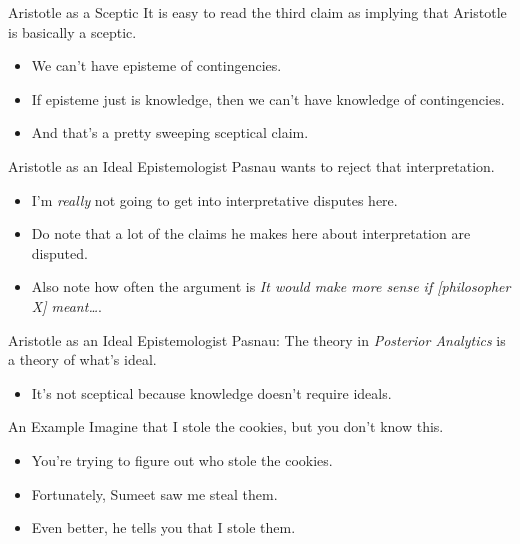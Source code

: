 \documentclass[
  17pt,
  letterpaper,
  ignorenonframetext,
  aspectratio=169,
  handout]{beamer}
\providecommand{\tightlist}{%
  \setlength{\itemsep}{0pt}\setlength{\parskip}{0pt}}\usepackage{longtable,booktabs,array}
\begin{document}
\begin{frame}{Aristotle as a Sceptic}
\protect\hypertarget{aristotle-as-a-sceptic}{}
It is easy to read the third claim as implying that Aristotle is
basically a sceptic.

\begin{itemize}[<+->]
\tightlist
\item
  We can't have episteme of contingencies.
\item
  If episteme just is knowledge, then we can't have knowledge of
  contingencies.
\item
  And that's a pretty sweeping sceptical claim.
\end{itemize}
\end{frame}

\begin{frame}{Aristotle as an Ideal Epistemologist}
\protect\hypertarget{aristotle-as-an-ideal-epistemologist}{}
Pasnau wants to reject that interpretation.

\begin{itemize}[<+->]
\tightlist
\item
  I'm \emph{really} not going to get into interpretative disputes here.
\item
  Do note that a lot of the claims he makes here about interpretation
  are disputed.
\item
  Also note how often the argument is \emph{It would make more sense if
  {[}philosopher X{]} meant\ldots{}}.
\end{itemize}
\end{frame}

\begin{frame}{Aristotle as an Ideal Epistemologist}
\protect\hypertarget{aristotle-as-an-ideal-epistemologist-1}{}
Pasnau: The theory in \emph{Posterior Analytics} is a theory of what's
ideal.

\begin{itemize}[<+->]
\tightlist
\item
  It's not sceptical because knowledge doesn't require ideals.
\end{itemize}
\end{frame}

\begin{frame}{An Example}
\protect\hypertarget{an-example}{}
Imagine that I stole the cookies, but you don't know this.

\begin{itemize}[<+->]
\tightlist
\item
  You're trying to figure out who stole the cookies.
\item
  Fortunately, Sumeet saw me steal them.
\item
  Even better, he tells you that I stole them.
\end{itemize}
\end{frame}
\end{document}
